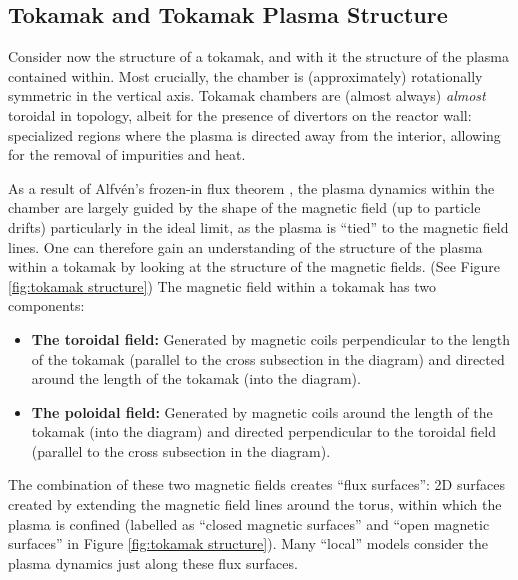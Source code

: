 \subsection*{Tokamak and Tokamak Plasma Structure}
    Consider now the structure of a tokamak, and with it the structure of the plasma contained within. Most crucially, the chamber is (approximately) rotationally symmetric in the vertical axis. Tokamak chambers are (almost always) \emph{almost} toroidal in topology, albeit for the presence of divertors on the reactor wall: specialized regions where the plasma is directed away from the interior, allowing for the removal of impurities and heat.
    
    As a result of Alfvén's frozen-in flux theorem \cite{Alfvén_1943}, the plasma dynamics within the chamber are largely guided by the shape of the magnetic field (up to particle drifts) particularly in the ideal limit, as the plasma is ``tied'' to the magnetic field lines. One can therefore gain an understanding of the structure of the plasma within a tokamak by looking at the structure of the magnetic fields. (See Figure \ref{fig:tokamak structure}) The magnetic field within a tokamak has two components:
    \begin{itemize}
        \item  {\bf The toroidal field:} Generated by magnetic coils perpendicular to the length of the tokamak (parallel to the cross subsection in the diagram) and directed around the length of the tokamak (into the diagram).
        \item  {\bf The poloidal field:} Generated by magnetic coils around the length of the tokamak (into the diagram) and directed perpendicular to the toroidal field (parallel to the cross subsection in the diagram).
    \end{itemize}
    The combination of these two magnetic fields creates ``flux surfaces'': 2D surfaces created by extending the magnetic field lines around the torus, within which the plasma is confined (labelled as ``closed magnetic surfaces'' and ``open magnetic surfaces'' in Figure \ref{fig:tokamak structure}). Many ``local'' models consider the plasma dynamics just along these flux surfaces.

